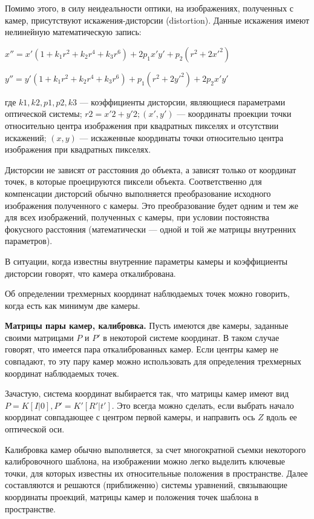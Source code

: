 Помимо этого, в силу неидеальности оптики, на изображениях, полученных с камер, присутствуют искажения-дисторсии (distortion). Данные искажения имеют нелинейную математическую запись:

$x''=x'(1+k_1r^2+k_2r^4+k_3r^6)+2p_1x'y'+p_2(r^2+2x'^2)$

$y''=y'(1+k_1r^2+k_2r^4+k_3r^6)+p_1(r^2+2y'^2)+2p_2x'y'$

где $k1, k2, p1, p2, k3$ — коэффициенты дисторсии, являющиеся параметрами оптической системы; $r2 = x'2 + y'2; (x', y')$ — координаты проекции точки относительно центра изображения при квадратных пикселях и отсутствии искажений; $(x, y)$ — искаженные координаты точки относительно центра изображения при квадратных пикселях.

Дисторсии не зависят от расстояния до объекта, а зависят только от координат точек, в которые проецируются пиксели объекта. Соответственно для компенсации дисторсий обычно выполняется преобразование исходного изображения полученного с камеры. Это преобразование будет одним и тем же для всех изображений, полученных с камеры, при условии постоянства фокусного расстояния (математически — одной и той же матрицы внутренних параметров).

В ситуации, когда известны внутренние параметры камеры и коэффициенты дисторсии говорят, что камера откалибрована.

Об определении трехмерных координат наблюдаемых точек можно говорить, когда есть как минимум две камеры.

\textbf{Матрицы пары камер, калибровка.} Пусть имеются две камеры, заданные своими матрицами $P$ и $P'$ в некоторой системе координат. В таком случае говорят, что имеется пара откалиброванных камер. Если центры камер не совпадают, то эту пару камер можно использовать для определения трехмерных координат наблюдаемых точек.

Зачастую, система координат выбирается так, что матрицы камер имеют вид $P = K[I|0], P' = K'[R'|t']$. Это всегда можно сделать, если выбрать начало координат совпадающее с центром первой камеры, и направить ось $Z$ вдоль ее оптической оси.

Калибровка камер обычно выполняется, за счет многократной съемки некоторого калибровочного шаблона, на изображении можно легко выделить ключевые точки, для которых известны их относительные положения в пространстве. Далее составляются и решаются (приближенно) системы уравнений, связывающие координаты проекций, матрицы камер и положения точек шаблона в пространстве.


